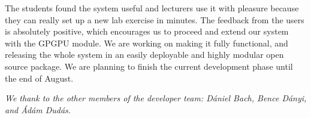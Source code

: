 \documentclass{llncs}
\begin{document}
The students found the system useful and lecturers use it with pleasure because they can really set up a new lab exercise in minutes. The feedback from the users is absolutely positive, which encourages us to proceed and extend our system with the GPGPU module. We are working on making it fully functional, and releasing the whole system in an easily deployable and highly modular open source package. We are planning to finish the current development phase until the end of August. 

\emph{We thank to the other members of the developer team: D\'aniel Bach, Bence D\'anyi, and \'Ad\'am Dud\'as. }




\end{document}

